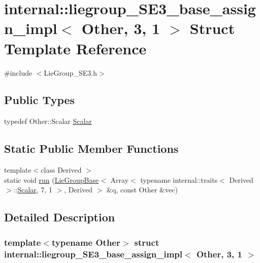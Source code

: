 \hypertarget{structinternal_1_1liegroup___s_e3__base__assign__impl_3_01_other_00_013_00_011_01_4}{}\section{internal\+:\+:liegroup\+\_\+\+S\+E3\+\_\+base\+\_\+assign\+\_\+impl$<$ Other, 3, 1 $>$ Struct Template Reference}
\label{structinternal_1_1liegroup___s_e3__base__assign__impl_3_01_other_00_013_00_011_01_4}


{\ttfamily \#include $<$Lie\+Group\+\_\+\+S\+E3.\+h$>$}

\subsection*{Public Types}
\begin{DoxyCompactItemize}
\item 
typedef Other\+::\+Scalar \hyperlink{structinternal_1_1liegroup___s_e3__base__assign__impl_3_01_other_00_013_00_011_01_4_aef78132c5f1f66237af2dcf4873a24d0}{Scalar}
\end{DoxyCompactItemize}
\subsection*{Static Public Member Functions}
\begin{DoxyCompactItemize}
\item 
{\footnotesize template$<$class Derived $>$ }\\static void \hyperlink{structinternal_1_1liegroup___s_e3__base__assign__impl_3_01_other_00_013_00_011_01_4_aac0ef6a07b1f6e3fe0f550c85edff934}{run} (\hyperlink{class_lie_group_base}{Lie\+Group\+Base}$<$ Array$<$ typename internal\+::traits$<$ Derived $>$\+::\hyperlink{structinternal_1_1liegroup___s_e3__base__assign__impl_3_01_other_00_013_00_011_01_4_aef78132c5f1f66237af2dcf4873a24d0}{Scalar}, 7, 1 $>$, Derived $>$ \&q, const Other \&vec)
\end{DoxyCompactItemize}


\subsection{Detailed Description}
\subsubsection*{template$<$typename Other$>$\newline
struct internal\+::liegroup\+\_\+\+S\+E3\+\_\+base\+\_\+assign\+\_\+impl$<$ Other, 3, 1 $>$}



